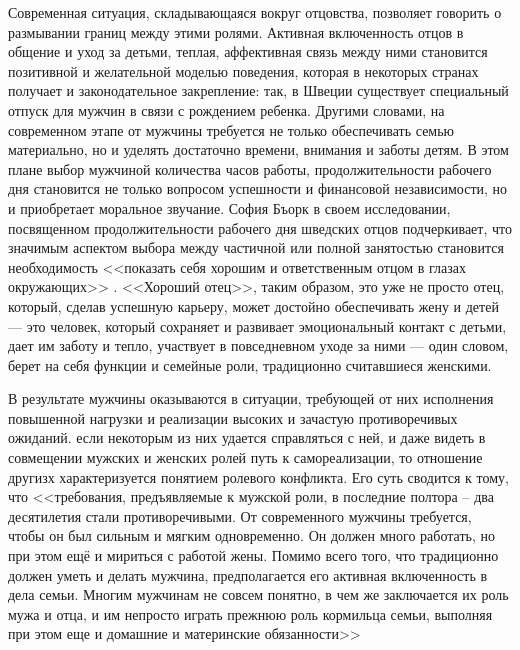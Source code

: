 \documentclass{../../common/thesisbyxetex}
\begin{document}
Современная ситуация, складывающаяся вокруг отцовства, позволяет говорить о размывании границ между
этими ролями. Активная включенность отцов в общение и уход за детьми, теплая, аффективная связь
между ними становится позитивной и желательной моделью поведения, которая в некоторых странах
получает и законодательное закрепление: так, в Швеции существует специальный отпуск для мужчин в
связи с рождением ребенка. Другими словами, на современном  этапе от мужчины требуется не только
обеспечивать семью
материально, но и уделять
достаточно времени, внимания и заботы детям. В этом плане выбор мужчиной количества часов работы,
продолжительности рабочего дня становится не только вопросом успешности и финансовой независимости,
но и приобретает моральное звучание. София Бъорк в своем исследовании, посвященном
продолжительности рабочего дня шведских отцов подчеркивает, что значимым аспектом  выбора
между частичной или полной занятостью становится необходимость <<показать себя хорошим и
ответственным отцом в глазах окружающих>> \cite[221]{morfat}. <<Хороший отец>>, таким образом, это
уже не просто отец, который, сделав успешную карьеру, может достойно обеспечивать жену и детей ---
это человек, который сохраняет и развивает эмоциональный контакт с детьми, дает им заботу и тепло,
участвует в повседневном уходе за ними --- один словом, берет на себя функции и семейные роли,
традиционно считавшиеся женскими.

В результате мужчины оказываются в ситуации, требующей от них исполнения повышенной нагрузки и
реализации высоких и зачастую противоречивых ожиданий. если некоторым из них удается справляться с
ней, и даже видеть в совмещении мужских и женских ролей путь к самореализации, то отношение другизх
характеризуется понятием ролевого конфликта. Его суть сводится к тому, что <<требования,
предъявляемые к мужской роли, в последние полтора – два десятилетия
стали противоречивыми. От современного мужчины требуется, чтобы он был сильным и
мягким одновременно. Он должен много работать, но при этом ещё и мириться с работой
жены. Помимо всего того, что традиционно должен уметь и делать мужчина,
предполагается его активная включенность в дела семьи. Многим мужчинам не совсем
понятно, в чем же заключается их роль мужа и отца, и им непросто играть прежнюю роль
кормильца семьи, выполняя при этом еще и домашние и материнские обязанности>> \cite[112]{confl}



\end{document}
